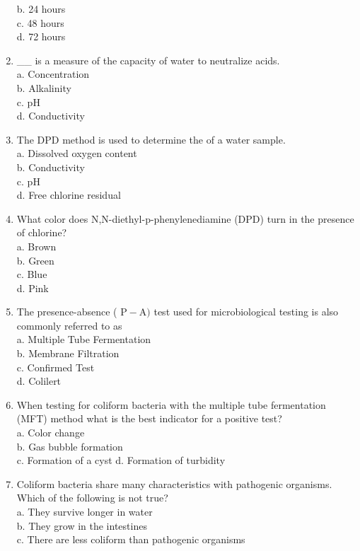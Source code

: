 \begin{enumerate}[1.]
b. 24 hours\\
c. 48 hours\\
d. 72 hours\\
\item \_\_ is a measure of the capacity of water to neutralize acids.\\
a. Concentration\\
b. Alkalinity\\
c. $\mathrm{pH}$\\
d. Conductivity\\
\item The DPD method is used to determine the of a water sample.\\
a. Dissolved oxygen content\\
b. Conductivity\\
c. $\mathrm{pH}$\\
d. Free chlorine residual\\
\item What color does N,N-diethyl-p-phenylenediamine (DPD) turn in the presence of chlorine?\\
a. Brown\\
b. Green\\
c. Blue\\
d. Pink\\
\item The presence-absence ( $\mathrm{P}-\mathrm{A})$ test used for microbiological testing is also commonly referred to as\\
a. Multiple Tube Fermentation\\
b. Membrane Filtration\\
c. Confirmed Test\\
d. Colilert\\
\item When testing for coliform bacteria with the multiple tube fermentation (MFT) method what is the best indicator for a positive test?\\
a. Color change\\
b. Gas bubble formation\\
c. Formation of a cyst d. Formation of turbidity\\
\item Coliform bacteria share many characteristics with pathogenic organisms. Which of the following is not true?\\
a. They survive longer in water\\
b. They grow in the intestines\\
c. There are less coliform than pathogenic organisms\\

\end{enumerate}
